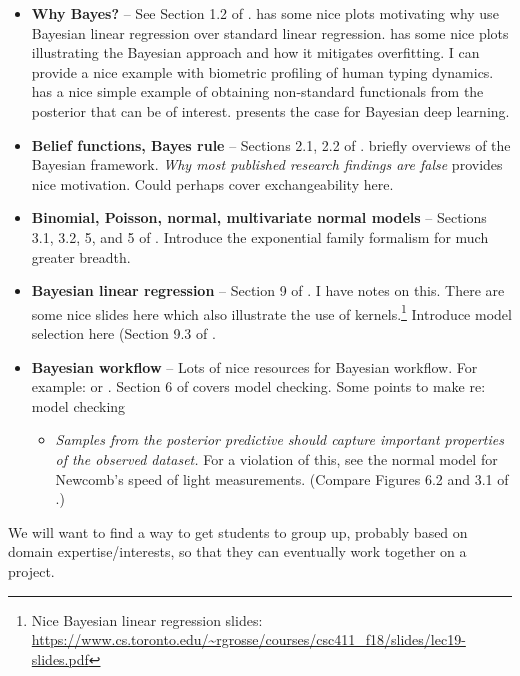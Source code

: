 \documentclass{article} %
\begin{document}
\begin{itemize}
\item \textbf{Why Bayes?} -- See Section 1.2 of \cite{hoff2009first}.   \cite{bishop2006pattern} has some nice plots motivating why use Bayesian linear regression over standard linear regression.   \cite{ghahramani2013bayesian}  has some nice plots illustrating the Bayesian approach and how it mitigates overfitting.   I can provide a nice example with biometric profiling of human typing dynamics.   \cite{held2006bayesian} has a nice simple example of obtaining non-standard functionals from the posterior that can be of interest.   \cite{wilson2020case} presents the case for Bayesian deep learning.  
\item \textbf{Belief functions,  Bayes rule} -- Sections 2.1,  2.2 of \cite{hoff2009first}.   \cite{ghahramani2013bayesian} briefly overviews of the Bayesian framework.  \textit{Why most published research findings are false} \cite{ioannidis2005most} provides nice motivation.    Could perhaps cover exchangeability here. 
\item \textbf{Binomial, Poisson, normal, multivariate normal models} -- Sections 3.1,  3.2, 5, and 5 of \cite{hoff2009first}.     Introduce the exponential family formalism \cite{wojnowiczXXXXexponential} for much greater breadth.   
\item \textbf{Bayesian linear regression} -- Section 9 of \cite{hoff2009first}.     I have notes on this.   There are some nice slides here which also illustrate the use of kernels.\footnote{Nice Bayesian linear regression slides: \url{https://www.cs.toronto.edu/~rgrosse/courses/csc411_f18/slides/lec19-slides.pdf}}   Introduce model selection here (Section 9.3 of \cite{hoff2009first}. 
\item \textbf{Bayesian workflow} -- Lots of nice resources for Bayesian workflow.    For example: \cite{gelman2020bayesian} or \cite{gabry2019visualization}.   Section 6 of \cite{gelman2013bayesian} covers model checking.       Some points to make re: model checking
	\begin{itemize}
	\item \textit{Samples from the posterior predictive should capture important properties of the observed dataset.}  For a violation of this,  see the normal model for Newcomb's speed of light measurements.  (Compare Figures 6.2 and 3.1 of \cite{gelman2013bayesian}.)
	\end{itemize}
\end{itemize}

We will want to find a way to get students to group up,  probably based on domain expertise/interests,  so that they can eventually work together on a project.  
\end{document}
